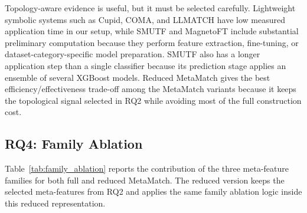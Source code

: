\documentclass[sigconf, nonacm]{acmart}
\begin{document}
Topology-aware evidence is useful, but it must be selected carefully. Lightweight symbolic systems such as Cupid, COMA, and LLMATCH have low measured application time in our setup, while SMUTF and MagnetoFT include substantial preliminary computation because they perform feature extraction, fine-tuning, or dataset-category-specific model preparation. SMUTF also has a longer application step than a single classifier because its prediction stage applies an ensemble of several XGBoost models. Reduced MetaMatch gives the best efficiency/effectiveness trade-off among the MetaMatch variants because it keeps the topological signal selected in RQ2 while avoiding most of the full construction cost.

\FloatBarrier

\subsection{RQ4: Family Ablation}

Table~\ref{tab:family_ablation} reports the contribution of the three meta-feature families for both full and reduced MetaMatch. The reduced version keeps the selected meta-features from RQ2 and applies the same family ablation logic inside this reduced representation.
\end{document}
